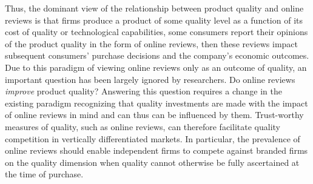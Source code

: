 \documentclass[12pt, leqno]{article}
\begin{document}
Thus, the dominant view of the relationship between product quality and online reviews  is that firms produce a product of some quality level as a function of its cost of quality or technological capabilities, some consumers report their opinions of the product quality in the form of online reviews, then these reviews impact subsequent consumers' purchase decisions and the company's economic outcomes. Due to this paradigm of viewing online reviews  only as an outcome of quality, an important question has been largely ignored by researchers. Do online reviews \textit{improve} product quality? Answering this question requires a change in the existing paradigm  recognizing that quality investments are made with the impact of online reviews in mind and can thus can be influenced by them. Trust-worthy measures of quality, such as online reviews, can therefore facilitate quality competition in vertically differentiated markets. In particular, the prevalence of online reviews should enable independent firms to compete against branded firms on the quality dimension when quality cannot otherwise be fully ascertained at the time of purchase. 
\end{document}
